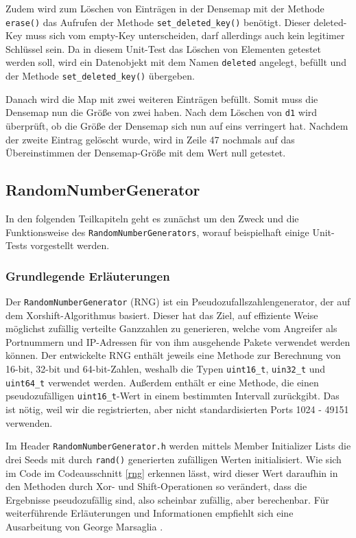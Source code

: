 \documentclass[../review_3.tex]{subfiles}
\begin{document}
Zudem wird zum Löschen von Einträgen in der Densemap mit der Methode \texttt{erase()} das Aufrufen der Methode \texttt{set\_deleted\_key()} benötigt. Dieser deleted-Key muss sich vom empty-Key unterscheiden, darf allerdings auch kein legitimer Schlüssel sein.
Da in diesem Unit-Test das Löschen von Elementen getestet werden soll, wird ein Datenobjekt mit dem Namen \texttt{deleted} angelegt, befüllt und der Methode \texttt{set\_deleted\_key()} übergeben.

Danach wird die Map mit zwei weiteren Einträgen befüllt. Somit muss die Densemap nun die Größe von zwei haben. Nach dem Löschen von \texttt{d1} wird überprüft, ob die Größe der Densemap sich nun auf eins verringert hat. Nachdem der zweite Eintrag gelöscht wurde, wird in Zeile 47 nochmals auf das Übereinstimmen der Densemap-Größe mit dem Wert null getestet.

\subsection{RandomNumberGenerator}

In den folgenden Teilkapiteln geht es zunächst um den Zweck und die Funktionsweise des \texttt{RandomNumberGenerators}, worauf beispielhaft einige Unit-Tests vorgestellt werden.

\subsubsection{Grundlegende Erläuterungen}
Der \texttt{RandomNumberGenerator} (RNG) ist ein Pseudozufallszahlengenerator, der auf dem Xorshift-Algorithmus basiert. Dieser hat das Ziel, auf effiziente Weise möglichst zufällig verteilte Ganzzahlen zu generieren, welche vom Angreifer als Portnummern und IP-Adressen für von ihm ausgehende Pakete verwendet werden können. Der entwickelte RNG enthält jeweils eine Methode zur Berechnung von 16-bit, 32-bit und 64-bit-Zahlen, weshalb die Typen \texttt{uint16\_t},  \texttt{uin32\_t} und \texttt{uint64\_t} verwendet werden. Außerdem enthält er eine Methode, die einen pseudozufälligen \texttt{uint16\_t}-Wert in einem bestimmten Intervall zurückgibt. Das ist nötig, weil wir die registrierten, aber nicht standardisierten Ports 1024 - 49151 verwenden.

Im Header \texttt{RandomNumberGenerator.h} werden mittels Member Initializer Lists die drei Seeds mit durch \texttt{rand()} generierten zufälligen Werten initialisiert. Wie sich im Code im Codeausschnitt \ref{rng} erkennen lässt, wird dieser Wert daraufhin in den Methoden durch Xor- und Shift-Operationen so verändert, dass die Ergebnisse pseudozufällig sind, also scheinbar zufällig, aber berechenbar. Für weiterführende Erläuterungen und Informationen empfiehlt sich eine Ausarbeitung von George Marsaglia \cite{xorshift}.
\end{document}
